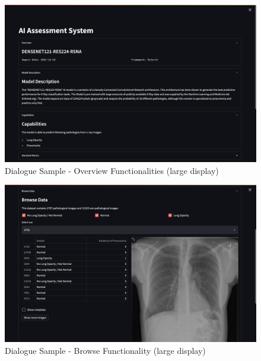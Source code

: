 \documentclass[11pt,a4paper,english]{scrreprt}
\begin{document}
\begin{figure}[htbp]
    \centering
    \includegraphics[width=\textwidth]{img/screenshots/samples/large/l_overview.png}
    \caption{Dialogue Sample - Overview Functionalities (large display)}
    \label{fig:samples_l_overview}
\end{figure}

\begin{figure}[htbp]
    \centering
    \includegraphics[width=\textwidth]{img/screenshots/samples/large/l_browse.png}
    \caption{Dialogue Sample - Browse Functionality (large display)}
    \label{fig:samples_l_browse}
\end{figure}
\end{document}
